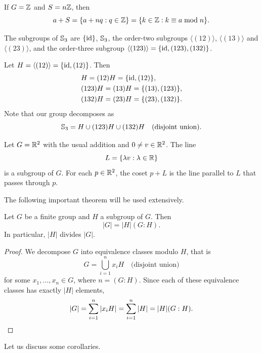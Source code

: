 \begin{example}
    If $G=\mathbb{Z}$ and $S=n\mathbb{Z}$, then 
    \[
    a+S=\{a+nq:q\in\mathbb{Z}\}=\{k\in\mathbb{Z}:k\equiv a\bmod n\}.
    \]
\end{example}
    
\begin{example}
\label{exa:S3_cosets}
    The subgroups of $\mathbb{S}_3$ are $\{\operatorname{id}\}$, $\mathbb{S}_3$, 
    the order-two subgroups 
    $\langle(12)\rangle$, 
    $\langle(13)\rangle$ and $\langle(23)\rangle$, and 
    the order-three subgroup $\langle(123)\rangle=\{\operatorname{id},(123),(132)\}$.  
    
    Let $H=\langle(12)\rangle=\{\operatorname{id},(12)\}$. Then 
    \begin{align*}
    &H=(12)H=\{\operatorname{id},(12)\},\\
    &(123)H=(13)H=\{(13),(123)\},\\
    &(132)H=(23)H=\{(23),(132)\}.
    \end{align*}
    Note that our group decomposes as 
    \[
    \mathbb{S}_3=H\cup (123)H\cup (132)H\quad\text{(disjoint union)}.
    \]
    \end{example}

    \begin{example}
        Let $G=\mathbb{R}^2$ with the usual addition 
        and $0\ne v\in\mathbb{R}^2$. The line 
        \[
        L=\{\lambda v:\lambda\in\mathbb{R}\}
        \]
        is a subgroup of $G$. For each 
        $p\in\mathbb{R}^2$, the coset $p+L$ 
        is the line parallel to $L$ that 
        passes through $p$.
    \end{example}

The following important theorem will be used extensively. 

\begin{theorem}[Lagrange]
    Let $G$ be a finite group and $H$ a subgroup of $G$. Then  
    \[ 
      |G|=|H|(G:H).
    \]
    In particular, $|H|$ divides $|G|$.
\end{theorem}

\begin{proof}
    We decompose $G$ into equivalence classes modulo $H$, that is 
    \[
    G=\bigcup_{i=1}^n x_iH\quad\text{(disjoint union)}
    \]
    for some $x_1,\dots,x_n\in G$, where $n=(G:H)$. 
    Since each of these equivalence classes has 
    exactly 
    $|H|$ elements,
    \[
            |G|=\sum_{i=1}^n|x_iH|=\sum_{i=1}^n|H|=|H|(G:H).\qedhere
    \]
\end{proof}

Let us discuss some corollaries. 

